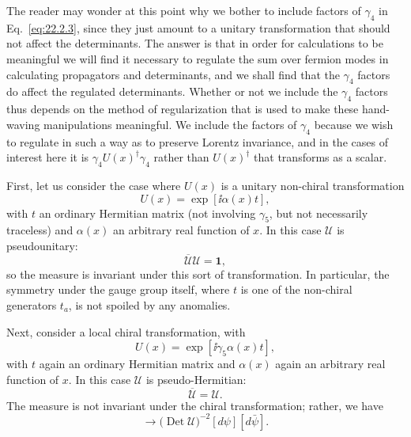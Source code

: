 The reader may wonder at this point why we bother to include factors of
$\gamma_4$ in Eq.~\eqref{eq:22.2.3}, since they just amount to a unitary
transformation that should not affect the determinants. The answer is that
in order for calculations to be meaningful we will find it necessary to
regulate the sum over fermion modes in calculating propagators and
determinants, and we shall find that the $\gamma_4$ factors do affect the
regulated determinants. Whether or not we include the $\gamma_4$ factors
thus depends on the method of regularization that is used to make these
hand-waving manipulations meaningful. We include the factors of $\gamma_4$
because we wish to regulate in such a way as to preserve Lorentz
invariance, and in the cases of interest here it is
$\gamma_4U(x)^\dagger\gamma_4$ rather than $U(x)^\dagger$ that transforms
as a scalar.

First, let us consider the case where $U(x)$ is a unitary non-chiral
transformation
\begin{equation}
 U(x)=\exp[\ii\alpha(x)t],
 \tag{22.2.4}\label{eq:22.2.4}
\end{equation}
with $t$ an ordinary Hermitian matrix (not involving $\gamma_5$, but not
necessarily traceless) and $\alpha(x)$ an arbitrary real function of $x$.
In this case $\mathcal U$ is pseudounitary:
\begin{equation}
 \overline{\mathcal U}\mathcal U=\mathbf{1},
 \tag{22.2.5}\label{eq:22.2.5}
\end{equation}
so the measure is invariant under this sort of transformation. In
particular, the symmetry under the gauge group itself, where $t$ is one of
the non-chiral generators $t_a$, is not spoiled by any anomalies.

Next, consider a local chiral transformation, with
\begin{equation}
 U(x)=\exp[\ii\gamma_5\alpha(x)t],
 \tag{22.2.6}\label{eq:22.2.6}
\end{equation}
with $t$ again an ordinary Hermitian matrix and $\alpha(x)$ again an
arbitrary real function of $x$. In this case $\mathcal U$ is
pseudo-Hermitian:
\begin{equation}
 \overline{\mathcal U}=\mathcal U.
 \tag{22.2.7}\label{eq:22.2.7}
\end{equation}
The measure is not invariant under the chiral transformation; rather, we
have
\begin{equation}
 [d\psi][d\bar\psi]\longrightarrow
 \bigl(\operatorname{Det}\mathcal U\bigr)^{-2}[d\psi][d\bar\psi].
 \tag{22.2.8}\label{eq:22.2.8}
\end{equation}

